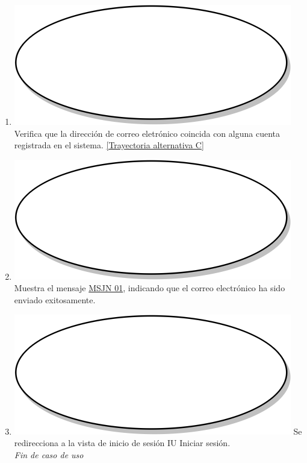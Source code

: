 \begin{enumerate}
  \item {\includegraphics[scale=.05]{Capitulo3/img/proceso.png} Verifica que la dirección de correo eletrónico coincida con alguna cuenta registrada en el sistema. \hyperref[cu1_1_ta_c]{[Trayectoria alternativa C]}}
  \item {\includegraphics[scale=.05]{Capitulo3/img/proceso.png} Muestra el mensaje \hyperref[msjn _01]{MSJN 01}, indicando que el correo electrónico ha sido enviado exitosamente.}
  \item {\includegraphics[scale=.1]{Capitulo3/img/proceso.png} Se redirecciona a la vista de inicio de sesión IU Iniciar sesión.} \\
  \textit{Fin de caso de uso} \\	
\end{enumerate}

